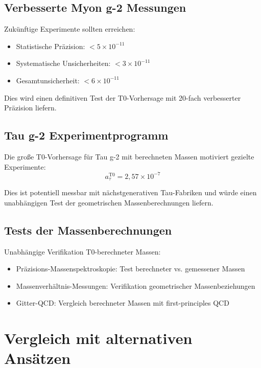 \documentclass[12pt,a4paper]{article}
\numberwithin{equation}{section}
\begin{document}
	\subsection{Verbesserte Myon g-2 Messungen}
	
	Zuk\"unftige Experimente sollten erreichen:
	\begin{itemize}
		\item Statistische Pr\"azision: $< 5 \times 10^{-11}$
		\item Systematische Unsicherheiten: $< 3 \times 10^{-11}$
		\item Gesamtunsicherheit: $< 6 \times 10^{-11}$
	\end{itemize}
	
	Dies wird einen definitiven Test der T0-Vorhersage mit 20-fach verbesserter Pr\"azision liefern.
	
	\subsection{Tau g-2 Experimentprogramm}
	
	Die gro\ss{}e T0-Vorhersage f\"ur Tau g-2 mit berechneten Massen motiviert gezielte Experimente:
	\begin{equation}
		a_\tau^{\text{T0}} = 2{,}57 \times 10^{-7}
	\end{equation}
	
	Dies ist potentiell messbar mit n\"achstgenerativen Tau-Fabriken und w\"urde einen unabh\"angigen Test der geometrischen Massenberechnungen liefern.
	
	\subsection{Tests der Massenberechnungen}
	
	Unabh\"angige Verifikation T0-berechneter Massen:
	\begin{itemize}
		\item Pr\"azisions-Massenspektroskopie: Test berechneter vs. gemessener Massen
		\item Massenverh\"altnis-Messungen: Verifikation geometrischer Massenbeziehungen
		\item Gitter-QCD: Vergleich berechneter Massen mit first-principles QCD
	\end{itemize}
	
	\section{Vergleich mit alternativen Ans\"atzen}
	
\end{document}
